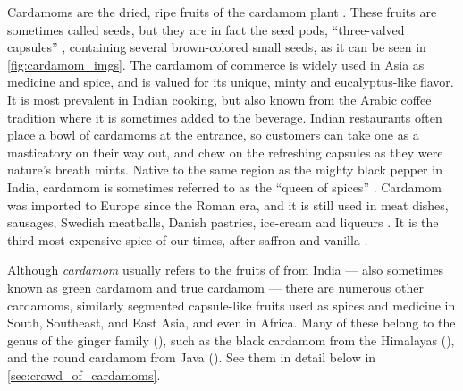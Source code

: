Cardamoms are the dried, ripe fruits of the cardamom plant . These fruits are sometimes called seeds, but they are in fact the seed pods, ``three-valved capsules'' \autocite[132]{van_wyk_culinary_2014}, containing several brown-colored small seeds, as it can be seen in \cref{fig:cardamom_imgs}. The cardamom of commerce is widely used in Asia as medicine and spice, and is valued for its unique, minty and eucalyptus-like flavor. It is most prevalent in Indian cooking, but also known from the Arabic coffee tradition where it is sometimes added to the beverage. Indian restaurants often place a bowl of cardamoms at the entrance, so customers can take one as a masticatory on their way out, and chew on the refreshing capsules as they were nature's breath mints. Native to the same region as the mighty black pepper in India, cardamom is sometimes referred to as the ``queen of spices'' \autocite[1]{ravindran_cardamom_2002}. Cardamom was imported to Europe since the Roman era, and it is still used in meat dishes, sausages, Swedish meatballs, Danish pastries, ice-cream and liqueurs \autocite[326]{mabberley_mabberleys_2017}. It is the third most expensive spice of our times, after saffron and vanilla \autocite{business_insider_why_2021}.

Although \textit{cardamom} usually refers to the fruits of  from India --- also sometimes known as green cardamom and true cardamom --- there are numerous other cardamoms, similarly segmented capsule-like fruits used as spices and medicine in South, Southeast, and East Asia, and even in Africa. Many of these belong to the  genus of the ginger family (), such as the black cardamom from the Himalayas (), and the round cardamom from Java (). See them in detail below in \cref{sec:crowd_of_cardamoms}.




